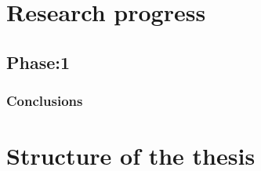 \documentclass[authoryear,12pt]{article}
\begin{document}
\section{Research progress}

\subsection{Phase:1}
\subsubsection{Conclusions}


\section{Structure of the thesis}


\clearpage


\end{document}
